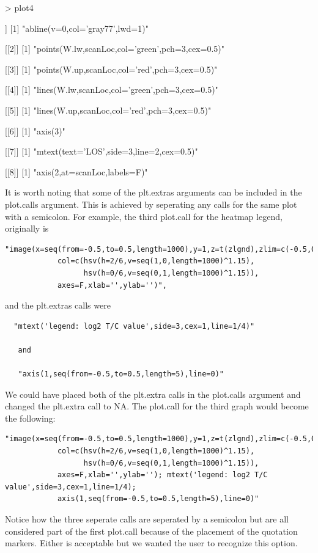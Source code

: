 \documentclass[]{article}
\begin{document}
\begin{Schunk}
\begin{Sinput}
> plot4
\end{Sinput}
\begin{Soutput}
[[1]]
[1] "abline(v=0,col='gray77',lwd=1)"

[[2]]
[1] "points(W.lw,scanLoc,col='green',pch=3,cex=0.5)"

[[3]]
[1] "points(W.up,scanLoc,col='red',pch=3,cex=0.5)"

[[4]]
[1] "lines(W.lw,scanLoc,col='green',pch=3,cex=0.5)"

[[5]]
[1] "lines(W.up,scanLoc,col='red',pch=3,cex=0.5)"

[[6]]
[1] "axis(3)"

[[7]]
[1] "mtext(text='LOS',side=3,line=2,cex=0.5)"

[[8]]
[1] "axis(2,at=scanLoc,labels=F)"
\end{Soutput}
\end{Schunk}
\quad It is worth noting that some of the plt.extras arguments can be included in the plot.calls argument. This is achieved by seperating any calls for the same plot with a semicolon. For example, the third plot.call for the heatmap legend, originally is  
\begin{verbatim}
"image(x=seq(from=-0.5,to=0.5,length=1000),y=1,z=t(zlgnd),zlim=c(-0.5,0.5),
            col=c(hsv(h=2/6,v=seq(1,0,length=1000)^1.15),
                  hsv(h=0/6,v=seq(0,1,length=1000)^1.15)),
            axes=F,xlab='',ylab='')",
\end{verbatim}
and the plt.extras calls were 
\begin{verbatim}
  "mtext('legend: log2 T/C value',side=3,cex=1,line=1/4)"
  
   and 

   "axis(1,seq(from=-0.5,to=0.5,length=5),line=0)"
\end{verbatim}

\quad We could have placed both of the plt.extra calls in the plot.calls argument and changed the plt.extra call to NA. The plot.call for the third graph would become the following:
\begin{verbatim}
"image(x=seq(from=-0.5,to=0.5,length=1000),y=1,z=t(zlgnd),zlim=c(-0.5,0.5),
            col=c(hsv(h=2/6,v=seq(1,0,length=1000)^1.15),
                  hsv(h=0/6,v=seq(0,1,length=1000)^1.15)),
            axes=F,xlab='',ylab=''); mtext('legend: log2 T/C value',side=3,cex=1,line=1/4);
            axis(1,seq(from=-0.5,to=0.5,length=5),line=0)"
\end{verbatim}
\quad Notice how the three seperate calls are seperated by a semicolon but are all considered part of the first plot.call because of the placement of the quotation markers. Either is acceptable but we wanted the user to recognize this option. 
\end{document}
